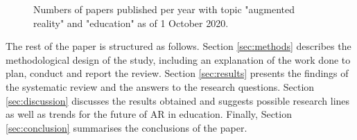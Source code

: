 \begin{figure}[ht]
	\begin{center}
	
	\caption{Numbers of papers published per year with topic "augmented reality" and "education" as of 1 October 2020.}
	\label{fig:pappublbg}
    \end{center}
\end{figure}

The rest of the paper is structured as follows. Section \ref{sec:methods} describes the methodological design of the study, including an explanation of the work done to plan, conduct and report the review. Section \ref{sec:results} presents the findings of the systematic review and the answers to the research questions. Section \ref{sec:discussion} discusses the results obtained and suggests possible research lines as well as trends for the future of AR in education. Finally, Section \ref{sec:conclusion} summarises the conclusions of the paper.
